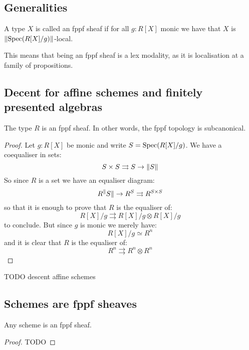 \label{fppf-sheaves}

\subsection{Generalities}

\begin{definition}
A type $X$ is called an fppf sheaf if for all $g:R[X]$ monic we have that $X$ is $\lVert \operatorname{Spec}(R[X]/g) \rVert$-local.
\end{definition}

This means that being an fppf sheaf is a lex modality, as it is localisation at a family of propositions.



\subsection{Decent for affine schemes and finitely presented algebras}

\begin{lemma}\label{fppf-subcanonical}
The type $R$ is an fppf sheaf. In other words, the fppf topology is subcanonical.
\end{lemma}

\begin{proof}
Let $g:R[X]$ be monic and write $S=\operatorname{Spec}(R[X]/g)$. We have a coequaliser in sets:
\[S\times S\rightrightarrows S \to \lVert S \rVert\]
So since $R$ is a set we have an equaliser diagram:
\[R^\lVert S \rVert \to R^S\rightrightarrows R^{S\times S}\]
so that it is enough to prove that $R$ is the equaliser of:
\[R[X]/g \rightrightarrows R[X]/g \otimes R[X]/g\]
to conclude. But since $g$ is monic we merely have:
\[R[X]/g \simeq R^n\]
and it is clear that $R$ is the equaliser of:
\[R^n \rightrightarrows R^n\otimes R^n\]
\end{proof}

\begin{lemma}
TODO descent affine schemes
\end{lemma}


\subsection{Schemes are fppf sheaves}

\begin{proposition}
Any scheme is an fppf sheaf.
\end{proposition}

\begin{proof}
TODO
\end{proof}


